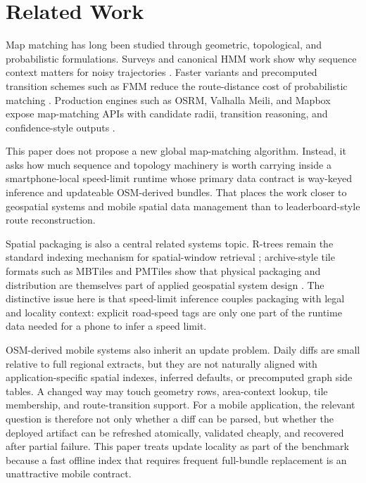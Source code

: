 \documentclass[sigconf]{acmart}
\begin{document}
\section{Related Work}

Map matching has long been studied through geometric, topological, and probabilistic formulations. Surveys and canonical HMM work show why sequence context matters for noisy trajectories \cite{quddus2007,newson2009,lou2009,goh2012,he2013,hunter2014}. Faster variants and precomputed transition schemes such as FMM reduce the route-distance cost of probabilistic matching \cite{yang2018fmm}. Production engines such as OSRM, Valhalla Meili, and Mapbox expose map-matching APIs with candidate radii, transition reasoning, and confidence-style outputs \cite{osrm_match_service,valhalla_meili,mapbox_map_matching_api}.

This paper does not propose a new global map-matching algorithm. Instead, it asks how much sequence and topology machinery is worth carrying inside a smartphone-local speed-limit runtime whose primary data contract is way-keyed inference and updateable OSM-derived bundles. That places the work closer to geospatial systems and mobile spatial data management than to leaderboard-style route reconstruction.

Spatial packaging is also a central related systems topic. R-trees remain the standard indexing mechanism for spatial-window retrieval \cite{guttman1984}; archive-style tile formats such as MBTiles and PMTiles show that physical packaging and distribution are themselves part of applied geospatial system design \cite{mbtiles_spec,pmtiles_docs}. The distinctive issue here is that speed-limit inference couples packaging with legal and locality context: explicit road-speed tags are only one part of the runtime data needed for a phone to infer a speed limit.

OSM-derived mobile systems also inherit an update problem. Daily diffs are small relative to full regional extracts, but they are not naturally aligned with application-specific spatial indexes, inferred defaults, or precomputed graph side tables. A changed way may touch geometry rows, area-context lookup, tile membership, and route-transition support. For a mobile application, the relevant question is therefore not only whether a diff can be parsed, but whether the deployed artifact can be refreshed atomically, validated cheaply, and recovered after partial failure. This paper treats update locality as part of the benchmark because a fast offline index that requires frequent full-bundle replacement is an unattractive mobile contract.
\end{document}
